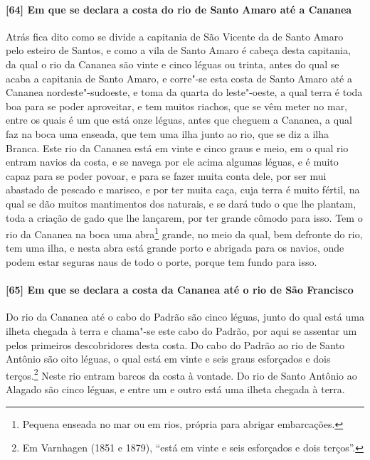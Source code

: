 \begin{linenumbers}
\paragraph{[64] Em que se declara a costa do rio de Santo Amaro até a Cananea} \quad
Atrás fica dito como se divide a capitania de São Vicente da de Santo Amaro pelo esteiro
de Santos, e como a vila de Santo Amaro é cabeça desta capitania, da qual o rio da Cananea
são vinte e cinco léguas ou trinta, antes do qual se acaba a capitania de Santo Amaro, e
corre"-se esta costa de Santo Amaro até a Cananea nordeste"-sudoeste, e toma da quarta do
leste"-oeste, a qual terra é toda boa para se poder aproveitar, e tem muitos riachos, que
se vêm meter no mar, entre os quais é um que está onze léguas, antes que cheguem a
Cananea, a qual faz na boca uma enseada, que tem uma ilha junto ao rio, que se diz a ilha
Branca. Este rio da Cananea está em vinte e cinco graus e meio, em o qual rio entram
navios da costa, e se navega por ele acima algumas léguas, e é muito capaz para se poder
povoar, e para se fazer muita conta dele, por ser mui abastado de pescado e marisco, e por
ter muita caça, cuja terra é muito fértil, na qual se dão muitos mantimentos dos naturais,
e se dará tudo o que lhe plantam, toda a criação de gado que lhe lançarem, por ter grande
cômodo para isso. Tem o rio da Cananea na boca uma abra\footnote{ Pequena enseada no mar
ou em rios, própria para abrigar embarcações.} grande, no meio da qual, bem defronte do
rio, tem uma ilha, e nesta abra está grande porto e abrigada para os navios, onde podem
estar seguras naus de todo o porte, porque tem fundo para isso.

\paragraph{[65] Em que se declara a costa da Cananea até o rio de São Francisco} \quad
Do rio da Cananea até o cabo do Padrão são cinco léguas, junto do qual está uma ilheta
chegada à terra e chama"-se este cabo do Padrão, por aqui se assentar um pelos primeiros
descobridores desta costa. Do cabo do Padrão ao rio de Santo Antônio são oito léguas, o
qual está em vinte e seis graus esforçados e dois terços.\footnote{ Em Varnhagen (1851 e
1879), ``está em vinte e seis esforçados e dois terços''.} Neste rio entram barcos da
costa à vontade. Do rio de Santo Antônio ao Alagado são cinco léguas, e entre um e outro
está uma ilheta chegada à terra.


\end{linenumbers}
